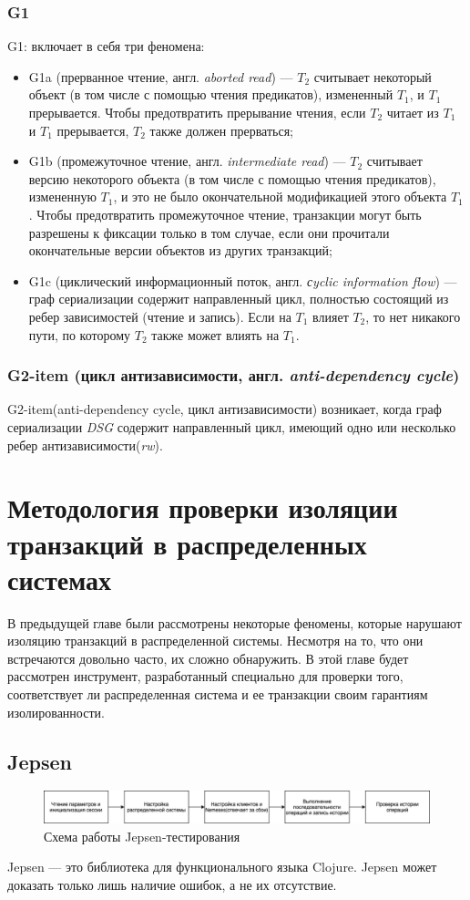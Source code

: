 \documentclass[12pt,  openany]{book}
\begin{document}
\subsection{G1}
G1: включает в себя три феномена: 
\begin{itemize}
\item G1a (прерванное чтение, англ. \textit{aborted read}) --- $T_2$ считывает некоторый объект (в том числе с помощью чтения предикатов), измененный $T_1$, и $T_1$ прерывается. Чтобы предотвратить прерывание чтения, если $T_2$ читает из $T_1$ и $T_1$ прерывается, $T_2$ также должен прерваться;
\item G1b (промежуточное чтение, англ. \textit{intermediate read}) --- $T_2$ считывает версию некоторого объекта (в том числе с помощью чтения предикатов), измененную $T_1$, и это не было окончательной модификацией этого объекта $T_1$. Чтобы предотвратить промежуточное чтение, транзакции могут быть разрешены к фиксации только в том случае, если они прочитали окончательные версии объектов из других транзакций;
\item G1c (циклический информационный поток, англ. \textit{сyclic information flow}) --- граф сериализации содержит направленный цикл, полностью состоящий из ребер зависимостей (чтение и запись). Если на $T_1$ влияет $T_2$, то нет никакого пути, по которому $T_2$ также может влиять на $T_1$.
\end{itemize}

\subsection{G2-item (цикл антизависимости, англ. \textit{anti-dependency cycle})}
G2-item(anti-dependency cycle, цикл антизависимости) возникает, когда граф сериализации \textit{DSG} содержит направленный цикл, имеющий одно или несколько ребер антизависимости(\textit{rw}). 

\chapter{Методология проверки изоляции транзакций в распределенных системах}
В предыдущей главе были рассмотрены некоторые феномены, которые нарушают изоляцию транзакций в распределенной системы. Несмотря на то, что они встречаются довольно часто, их сложно обнаружить.  В этой главе будет рассмотрен инструмент, разработанный специально для проверки того, соответствует ли распределенная система и ее транзакции своим гарантиям изолированности.
\section{Jepsen}
\begin{figure}[H]
  \includegraphics[width=\textwidth]{jepsen.jpeg}
  \caption{Схема работы Jepsen-тестирования}
\end{figure}
\par Jepsen --- это библиотека для функционального языка Clojure. Jepsen может доказать только лишь наличие ошибок, а не их отсутствие.
\end{document}
